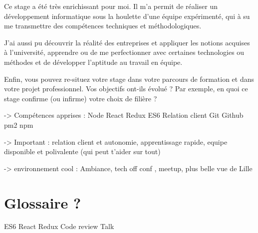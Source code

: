 \documentclass[12pt,a4paper]{article}
\begin{document}
  Ce stage a été très enrichissant pour moi. Il m'a permit de réaliser un
  développement informatique sous la houlette d'une équipe expérimenté,
  qui à su me transmettre des compétences techniques et méthodologiques.

  J'ai aussi pu découvrir la réalité des entreprises et appliquer les
  notions acquises à l'université, apprendre ou de me perfectionner avec
  certaines technologies ou méthodes et de développer l'aptitude au
  travail en équipe.

  Enfin, vous pouvez re-situez votre stage dans votre parcours de
  formation et dans votre projet professionnel. Vos objectifs ont-ils
  évolué ? Par exemple, en quoi ce stage confirme (ou infirme) votre choix
  de filière ?

  -\textgreater{} Compétences apprises : Node React Redux ES6 Relation
  client Git Github pm2 npm

  -\textgreater{} Important : relation client et autonomie, apprentissage
  rapide, equipe disponible et polivalente (qui peut t'aider sur tout)

  -\textgreater{} environnement cool : Ambiance, tech off conf , meetup,
  plus belle vue de Lille

  \newpage

  \section{Glossaire ?}\label{glossaire}

  ES6 React Redux Code review Talk
\end{document}
